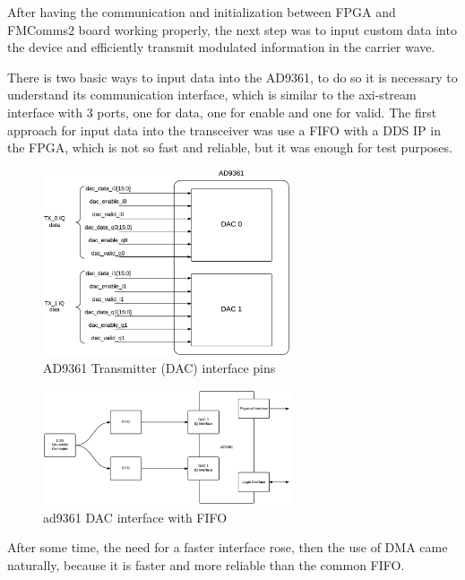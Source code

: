After having the communication and initialization between FPGA and FMComms2
board working properly, the next step was to input custom data into the device
and efficiently transmit modulated information in the carrier wave.

There is two basic ways to input data into the AD9361, to do so it is necessary to understand
its communication interface, which is similar to the axi-stream interface with
3 ports, one for data, one for enable and one for valid. The first approach for
input data into the transceiver was use a FIFO with a DDS IP in the FPGA, which
is not so fast and reliable, but it was enough for test purposes.

\begin{figure}[htbp]
    \centering
    \includegraphics[width=0.65\textwidth]{./figures/ad9361tx_pins}
    \caption{ AD9361 Transmitter (DAC) interface pins
    \label{fig:txpins}}
\end{figure}


\begin{figure}[htbp]
    \centering
    \includegraphics[width=0.65\textwidth]{./figures/dac_fifo}
    \caption{ ad9361 DAC interface with FIFO
    \label{fig:ad9361txfifo}}
\end{figure}

After some time, the need for a faster interface rose, then the use of DMA came
naturally, because it is faster and more reliable than the common FIFO.


